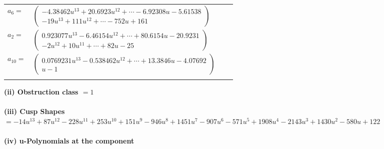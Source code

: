 \documentclass[1p]{elsarticle_modified}
\theoremstyle{definition}
\begin{document}
\begin{tabular}{m{7pt} m{180pt} m{7pt} m{180pt} }
\flushright $a_{6}=$&$\begin{pmatrix}-4.38462 u^{13}+20.6923 u^{12}+\cdots-6.92308 u-5.61538\\-19 u^{13}+111 u^{12}+\cdots-752 u+161\end{pmatrix}$ \\
\flushright $a_{2}=$&$\begin{pmatrix}0.923077 u^{13}-6.46154 u^{12}+\cdots+80.6154 u-20.9231\\-2 u^{12}+10 u^{11}+\cdots+82 u-25\end{pmatrix}$ \\
\flushright $a_{10}=$&$\begin{pmatrix}0.0769231 u^{13}-0.538462 u^{12}+\cdots+13.3846 u-4.07692\\u-1\end{pmatrix}$\\&\end{tabular}
\flushleft \textbf{(ii) Obstruction class $= 1$}\\~\\
\flushleft \textbf{(iii) Cusp Shapes $= -14 u^{13}+87 u^{12}-228 u^{11}+253 u^{10}+151 u^9-946 u^8+1451 u^7-907 u^6-571 u^5+1908 u^4-2143 u^3+1430 u^2-580 u+122$}\\~\\
\newpage\renewcommand{\arraystretch}{1}
\flushleft \textbf{(iv) u-Polynomials at the component}\newline \\
\end{document}

